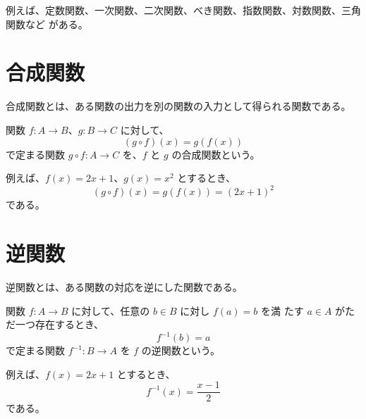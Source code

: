 \documentclass[11pt]{ltjsreport}
\begin{document}
例えば、定数関数、一次関数、二次関数、べき関数、指数関数、対数関数、三角関数など
がある。

\section{合成関数}

合成関数とは、ある関数の出力を別の関数の入力として得られる関数である。

関数 \( f : A \to B \)、\( g : B \to C \) に対して、
\[
   (g \circ f)(x) = g(f(x))
\]
で定まる関数 \( g \circ f : A \to C \) を、\( f \) と \( g \) の合成関数という。

例えば、\( f(x) = 2x + 1 \)、\( g(x) = x^2 \) とするとき、
\[
   (g \circ f)(x) = g(f(x)) = (2x + 1)^2
\]
である。

\section{逆関数}

逆関数とは、ある関数の対応を逆にした関数である。

関数 \( f : A \to B \) に対して、任意の \( b \in B \) に対し \( f(a) = b \) を満
たす \( a \in A \) がただ一つ存在するとき、
\[
   f^{-1}(b) = a
\]
で定まる関数 \( f^{-1} : B \to A \) を \( f \) の逆関数という。

例えば、\( f(x) = 2x + 1 \) とするとき、
\[
   f^{-1}(x) = \frac{x - 1}{2}
\]
である。
\end{document}
